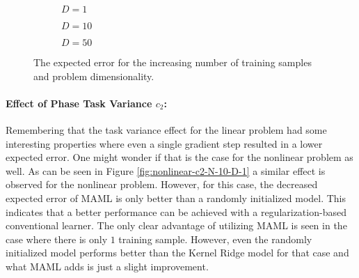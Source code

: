 \begin{figure}[!h]
  \centering
    \begin{subfigure}{0.32\textwidth}
      \centering
      \caption{$D=1$}
      \label{fig:nonlinear-N-D-1}
    \end{subfigure}
    \begin{subfigure}{0.32\textwidth}
      \centering
      \caption{$D=10$}
      \label{fig:nonlinear-N-D-10}
    \end{subfigure}
    \begin{subfigure}{0.32\textwidth}
      \centering
      \caption{$D=50$}
      \label{fig:nonlinear-N-D-50}
    \end{subfigure}
  \caption{The expected error for the increasing number of training samples and problem dimensionality.}\label{fig:nonlinear-N}
\end{figure}


\paragraph{Effect of Phase Task Variance $c_2$:} Remembering that the task variance effect for the linear problem had some interesting properties where even a single gradient step resulted in a lower expected error. One might wonder if that is the case for the nonlinear problem as well. As can be seen in Figure \ref{fig:nonlinear-c2-N-10-D-1} a similar effect is observed for the nonlinear problem. However, for this case, the decreased expected error of MAML is only better than a randomly initialized model. This indicates that a better performance can be achieved with a regularization-based conventional learner. The only clear advantage of utilizing MAML is seen in the case where there is only $1$ training sample. However, even the randomly initialized model performs better than the Kernel Ridge model for that case and what MAML adds is just a slight improvement. 

